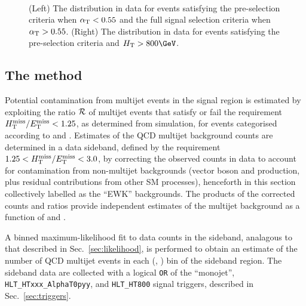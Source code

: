 \begin{figure}[!t]
 \centering
  \\
 \caption{(Left) The \alphat distribution in data for events
   satisfying the pre-selection criteria when $\alpha_{\text{T}} < 0.55$ and the
   full signal selection criteria when $\alpha_{\text{T}} > 0.55$. (Right) The
   \bdphi distribution in data for events satisfying the pre-selection
   criteria and $\scalht > 800\GeV$. 
 }
 \label{fig:alphat_bdphi_distr}
\end{figure}

\subsection{The method}
\label{sec:qcdMethod}

Potential contamination from multijet events in the signal region is
estimated by exploiting the ratio $\mbox{$\mathcal{R}$}$ of multijet events that
satisfy or fail the requirement $\mbox{$H_{\rm T}^{\rm miss}$}/\mbox{$E_\text{T}^{\rm miss}$} < 1.25$, as determined from
simulation, for events categorised according to \njet and
\scalht. Estimates of the QCD multijet background counts are
determined in a data sideband, defined by the requirement $1.25 <
\mbox{$H_{\rm T}^{\rm miss}$}/\mbox{$E_\text{T}^{\rm miss}$} < 3.0$, by correcting the observed counts in data to account
for contamination from non-multijet backgrounds (vector boson and
\ttbar production, plus residual contributions from other SM
processes), henceforth in this section collectively labelled as the
``EWK'' backgrounds. The products of the corrected counts and ratios
provide independent estimates of the multijet background as a function
of \njet and \scalht.

A binned maximum-likelihood fit to data counts in the sideband,
analagous to that described in Sec.~\ref{sec:likelihood}, is performed
to obtain an estimate of the number of QCD multijet events in each
(\njet, \scalht) bin of the sideband region. The sideband data are
collected with a logical \verb!OR!  of the ``monojet'',
\verb!HLT_HTxxx_AlphaT0pyy!, and \verb!HLT_HT800!  signal triggers,
described in Sec.~\ref{sec:triggers}.


